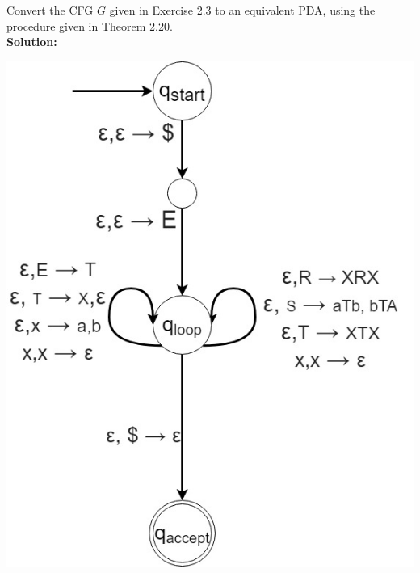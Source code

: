 \documentclass[12pt]{article}
\begin{document}
Convert the CFG $G$ given in Exercise 2.3 to an equivalent PDA, using the procedure given in Theorem 2.20. \\
\textbf{Solution:} \\
\centerline{ \includegraphics[scale=.65]{2.12.JPG}}
\end{document}
